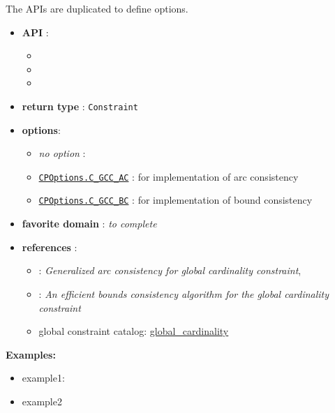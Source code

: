 The APIs are duplicated to define options. 

\begin{itemize}
	\item \textbf{API} :
      \begin{itemize}
	\item {}
	\item {}
	\item {}
      \end{itemize}
	\item \textbf{return type} : \texttt{Constraint}
	\item \textbf{options}:
	\begin{itemize}
		\item \emph{no option} :
		\item \hyperlink{cgccac:cgccacoptions}{\tt CPOptions.C\_GCC\_AC} : for \cite{ReginAAAI96} implementation of arc consistency
		\item \hyperlink{cgccbc:cgccbcoptions}{\tt CPOptions.C\_GCC\_BC} : for  \cite{QuimperCP03} implementation of bound consistency
	\end{itemize}
	\item \textbf{favorite domain} : \emph{to complete}
	\item \textbf{references} :
      \begin{itemize}
      \item \cite{ReginAAAI96}: \emph{Generalized arc consistency for global cardinality constraint},
      \item \cite{QuimperCP03}: \emph{An efficient bounds consistency algorithm for the global cardinality constraint}
      \item global constraint catalog: \href{http://www.emn.fr/x-info/sdemasse/gccat/Cglobal_cardinality.html}{global\_cardinality}
      \end{itemize}
\end{itemize}

\textbf{Examples:}
\begin{itemize}
	\item example1:
\end{itemize}



\begin{itemize}
	\item example2
\end{itemize}


